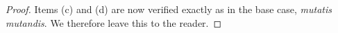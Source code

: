 \documentclass[10pt,a4paper]{amsart}
\begin{document}
\begin{proof}
  Items (c) and (d) are now verified exactly as in the base case, \emph{mutatis 
  mutandis}. We therefore leave this to the reader.
\end{proof}
\end{document}
